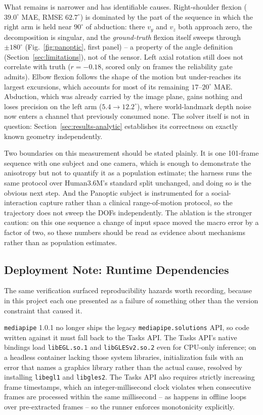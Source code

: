 \documentclass[conference]{IEEEtran}
\begin{document}
What remains is narrower and has identifiable causes. Right-shoulder
flexion ($39.0^\circ$ MAE, RMSE $62.7^\circ$) is dominated by the part of
the sequence in which the right arm is held near $90^\circ$ of
abduction: there $v_y$ and $v_z$ both approach zero, the decomposition is
singular, and the \emph{ground-truth} flexion itself sweeps through
$\pm180^\circ$ (Fig.~\ref{fig:panoptic}, first panel) -- a property of
the angle definition (Section~\ref{sec:limitations}), not of the sensor.
Left axial rotation still does not correlate with truth ($r=-0.18$,
scored only on frames the reliability gate admits). Elbow flexion follows
the shape of the motion but under-reaches its largest excursions, which
accounts for most of its remaining $17$--$20^\circ$ MAE. Abduction, which
was already carried by the image plane, gains nothing and loses precision
on the left arm ($5.4\to12.2^\circ$), where world-landmark depth noise
now enters a channel that previously consumed none. The solver itself is
not in question: Section~\ref{sec:results-analytic} establishes its
correctness on exactly known geometry independently.

Two boundaries on this measurement should be stated plainly. It is one
101-frame sequence with one subject and one camera, which is enough to
demonstrate the anisotropy but not to quantify it as a population
estimate; the harness runs the same protocol over Human3.6M's standard
split unchanged, and doing so is the obvious next step. And the Panoptic
subject is instrumented for a social-interaction capture rather than a
clinical range-of-motion protocol, so the trajectory does not sweep the
DOFs independently. The ablation is the stronger caution: on this one
sequence a change of input space moved the macro error by a factor of
two, so these numbers should be read as evidence about mechanisms rather
than as population estimates.

\subsection{Deployment Note: Runtime Dependencies}
\label{sec:deps}
The same verification surfaced reproducibility hazards worth recording,
because in this project each one presented as a failure of something
other than the version constraint that caused it.

\texttt{mediapipe} 1.0.1 no longer ships the legacy
\texttt{mediapipe.solutions} API, so code written against it must fall
back to the Tasks API. The Tasks API's native bindings load
\texttt{libEGL.so.1} and \texttt{libGLESv2.so.2} even for CPU-only
inference; on a headless container lacking those system libraries,
initialization fails with an error that names a graphics library rather
than the actual cause, resolved by installing \texttt{libegl1} and
\texttt{libgles2}. The Tasks API also requires strictly increasing frame
timestamps, which an integer-millisecond clock violates when consecutive
frames are processed within the same millisecond -- as happens in offline
loops over pre-extracted frames -- so the runner enforces monotonicity
explicitly.
\end{document}
